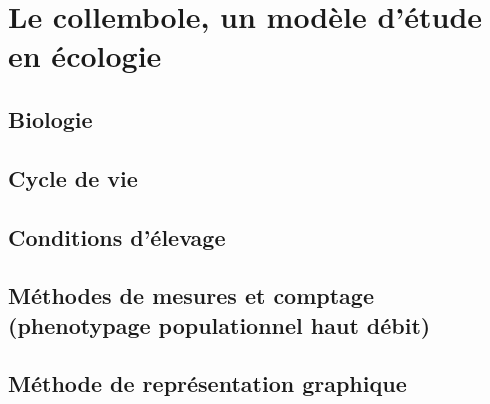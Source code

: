 \chapter{Le collembole, un modèle d'étude en écologie}
\section{Biologie}
\section{Cycle de vie}
\section{Conditions d’élevage}
\section{Méthodes de mesures et comptage (phenotypage populationnel haut débit)}
\section{Méthode de représentation graphique}

